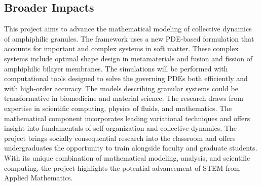 \documentclass[10pt]{article}
\begin{document}
\subsection*{Broader Impacts}
\vspace{-0.1in}
This project aims to advance the mathematical modeling of collective
dynamics of amphiphilic granules. The framework uses a new PDE-based
formulation that accounts for important and complex systems in soft
matter. These complex systems include optimal shape design in
metamaterials and fusion and fission of amphiphilic bilayer membranes.
The simulations will be performed with computational tools designed to
solve the governing PDEs both efficiently and with high-order accuracy.
The models describing granular systems could be transformative in
biomedicine and material science. The research draws from expertise in
scientific computing, physics of fluids, and mathematics. The
mathematical component incorporates leading variational techniques and
offers insight into fundamentals of self-organization and collective
dynamics. The project brings socially consequential research into the
classroom and offers undergraduates the opportunity to train alongside
faculty and graduate students. With its unique combination of
mathematical modeling, analysis, and scientific computing, the project
highlights the potential advancement of STEM from Applied Mathematics.
\end{document}
